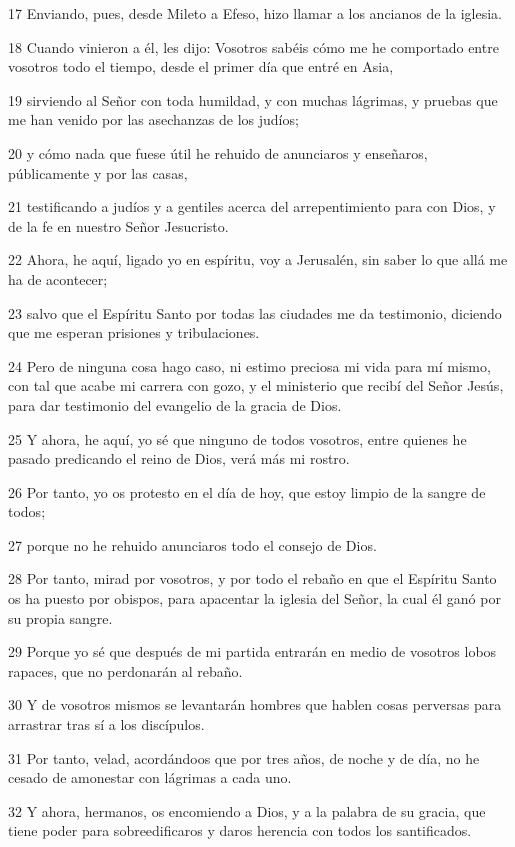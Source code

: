 \par 17 Enviando, pues, desde Mileto a Efeso, hizo llamar a los ancianos de la iglesia.
\par 18 Cuando vinieron a él, les dijo: Vosotros sabéis cómo me he comportado entre vosotros todo el tiempo, desde el primer día que entré en Asia,
\par 19 sirviendo al Señor con toda humildad, y con muchas lágrimas, y pruebas que me han venido por las asechanzas de los judíos;
\par 20 y cómo nada que fuese útil he rehuido de anunciaros y enseñaros, públicamente y por las casas,
\par 21 testificando a judíos y a gentiles acerca del arrepentimiento para con Dios, y de la fe en nuestro Señor Jesucristo.
\par 22 Ahora, he aquí, ligado yo en espíritu, voy a Jerusalén, sin saber lo que allá me ha de acontecer;
\par 23 salvo que el Espíritu Santo por todas las ciudades me da testimonio, diciendo que me esperan prisiones y tribulaciones.
\par 24 Pero de ninguna cosa hago caso, ni estimo preciosa mi vida para mí mismo, con tal que acabe mi carrera con gozo, y el ministerio que recibí del Señor Jesús, para dar testimonio del evangelio de la gracia de Dios.
\par 25 Y ahora, he aquí, yo sé que ninguno de todos vosotros, entre quienes he pasado predicando el reino de Dios, verá más mi rostro.
\par 26 Por tanto, yo os protesto en el día de hoy, que estoy limpio de la sangre de todos;
\par 27 porque no he rehuido anunciaros todo el consejo de Dios.
\par 28 Por tanto, mirad por vosotros, y por todo el rebaño en que el Espíritu Santo os ha puesto por obispos, para apacentar la iglesia del Señor, la cual él ganó por su propia sangre.
\par 29 Porque yo sé que después de mi partida entrarán en medio de vosotros lobos rapaces, que no perdonarán al rebaño.
\par 30 Y de vosotros mismos se levantarán hombres que hablen cosas perversas para arrastrar tras sí a los discípulos.
\par 31 Por tanto, velad, acordándoos que por tres años, de noche y de día, no he cesado de amonestar con lágrimas a cada uno.
\par 32 Y ahora, hermanos, os encomiendo a Dios, y a la palabra de su gracia, que tiene poder para sobreedificaros y daros herencia con todos los santificados.
